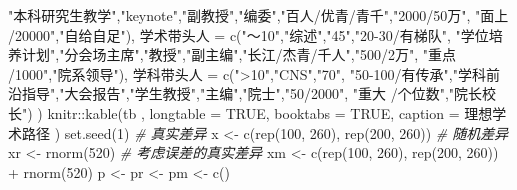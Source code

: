 \documentclass[]{tufte-book}
\newenvironment{Shaded}{}{}
\newcommand{\AttributeTok}[1]{\textcolor[rgb]{0.49,0.56,0.16}{#1}}
\newcommand{\CommentTok}[1]{\textcolor[rgb]{0.38,0.63,0.69}{\textit{#1}}}
\newcommand{\ConstantTok}[1]{\textcolor[rgb]{0.53,0.00,0.00}{#1}}
\newcommand{\DecValTok}[1]{\textcolor[rgb]{0.25,0.63,0.44}{#1}}
\newcommand{\FunctionTok}[1]{\textcolor[rgb]{0.02,0.16,0.49}{#1}}
\newcommand{\NormalTok}[1]{#1}
\newcommand{\OtherTok}[1]{\textcolor[rgb]{0.00,0.44,0.13}{#1}}
\newcommand{\SpecialCharTok}[1]{\textcolor[rgb]{0.25,0.44,0.63}{#1}}
\newcommand{\StringTok}[1]{\textcolor[rgb]{0.25,0.44,0.63}{#1}}
\begin{document}
\begin{Shaded}
\begin{Highlighting}[]
                  \StringTok{"本科研究生教学"}\NormalTok{,}\StringTok{"keynote"}\NormalTok{,}\StringTok{"副教授"}\NormalTok{,}\StringTok{"编委"}\NormalTok{,}\StringTok{"百人/优青/青千"}\NormalTok{,}\StringTok{"2000/50万"}\NormalTok{,}
                  \StringTok{"面上 /20000"}\NormalTok{,}\StringTok{"自给自足"}\NormalTok{),}
\NormalTok{        学术带头人 }\OtherTok{=} \FunctionTok{c}\NormalTok{(}\StringTok{"～10"}\NormalTok{,}\StringTok{"综述"}\NormalTok{,}\StringTok{"45"}\NormalTok{,}\StringTok{"20{-}30/有梯队"}\NormalTok{,}
                  \StringTok{"学位培养计划"}\NormalTok{,}\StringTok{"分会场主席"}\NormalTok{,}\StringTok{"教授"}\NormalTok{,}\StringTok{"副主编"}\NormalTok{,}\StringTok{"长江/杰青/千人"}\NormalTok{,}\StringTok{"500/2万"}\NormalTok{,}
                  \StringTok{"重点 /1000"}\NormalTok{,}\StringTok{"院系领导"}\NormalTok{),}
\NormalTok{        学科带头人 }\OtherTok{=} \FunctionTok{c}\NormalTok{(}\StringTok{"\textgreater{}10"}\NormalTok{,}\StringTok{"CNS"}\NormalTok{,}\StringTok{"70"}\NormalTok{,}
                  \StringTok{"50{-}100/有传承"}\NormalTok{,}\StringTok{"学科前沿指导"}\NormalTok{,}\StringTok{"大会报告"}\NormalTok{,}\StringTok{"学生教授"}\NormalTok{,}\StringTok{"主编"}\NormalTok{,}\StringTok{"院士"}\NormalTok{,}\StringTok{"50/2000"}\NormalTok{,}
                  \StringTok{"重大 /个位数"}\NormalTok{,}\StringTok{"院长校长"}\NormalTok{)}
\NormalTok{)}
\NormalTok{knitr}\SpecialCharTok{::}\FunctionTok{kable}\NormalTok{(tb}
\NormalTok{             , }\AttributeTok{longtable =} \ConstantTok{TRUE}\NormalTok{, }\AttributeTok{booktabs =} \ConstantTok{TRUE}\NormalTok{,}
             \AttributeTok{caption =} \StringTok{\textquotesingle{}理想学术路径\textquotesingle{}}
\NormalTok{)}
\FunctionTok{set.seed}\NormalTok{(}\DecValTok{1}\NormalTok{)}
\CommentTok{\# 真实差异}
\NormalTok{x }\OtherTok{\textless{}{-}} \FunctionTok{c}\NormalTok{(}\FunctionTok{rep}\NormalTok{(}\DecValTok{100}\NormalTok{, }\DecValTok{260}\NormalTok{), }\FunctionTok{rep}\NormalTok{(}\DecValTok{200}\NormalTok{, }\DecValTok{260}\NormalTok{))}
\CommentTok{\# 随机差异}
\NormalTok{xr }\OtherTok{\textless{}{-}} \FunctionTok{rnorm}\NormalTok{(}\DecValTok{520}\NormalTok{)}
\CommentTok{\# 考虑误差的真实差异}
\NormalTok{xm }\OtherTok{\textless{}{-}} \FunctionTok{c}\NormalTok{(}\FunctionTok{rep}\NormalTok{(}\DecValTok{100}\NormalTok{, }\DecValTok{260}\NormalTok{), }\FunctionTok{rep}\NormalTok{(}\DecValTok{200}\NormalTok{, }\DecValTok{260}\NormalTok{)) }\SpecialCharTok{+} \FunctionTok{rnorm}\NormalTok{(}\DecValTok{520}\NormalTok{)}
\NormalTok{p }\OtherTok{\textless{}{-}}\NormalTok{ pr }\OtherTok{\textless{}{-}}\NormalTok{ pm }\OtherTok{\textless{}{-}} \FunctionTok{c}\NormalTok{()}

\end{Highlighting}
\end{Shaded}
\end{document}
